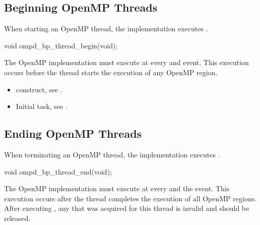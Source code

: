 \subsection{Beginning OpenMP Threads}
\label{subsubsec:ompd_bp_thread_begin}

\summary
When starting an OpenMP thread, the implementation executes
.

\format
\begin{cspecific}
\begin{ompSyntax}
void ompd_bp_thread_begin(void);
\end{ompSyntax}
\end{cspecific}

\descr
The OpenMP implementation must execute  at 
every  and  event.
This execution occurs before the thread starts the execution of any 
OpenMP region.

\crossreferences
\begin{itemize}
\item {} construct, see .

\item Initial task, see .
\end{itemize}



\subsection{Ending OpenMP Threads}
\label{subsubsec:ompd_bp_thread_end}

\summary
When terminating an OpenMP thread, the implementation 
executes .

\format
\begin{cspecific}
\begin{ompSyntax}
void ompd_bp_thread_end(void);
\end{ompSyntax}
\end{cspecific}

\descr
The OpenMP implementation must execute  
at every  and the  event.
This execution occurs after the thread completes the execution of 
all OpenMP regions. After executing , any 
 that was acquired for this thread is invalid 
and should be released.

